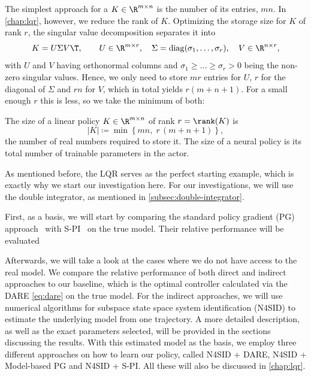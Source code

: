 The simplest approach for a $K \in \R^{m \times n}$ is the number of its entries,
$m n$. In \cref{chap:lqr}, however, we reduce the rank of $K$.
Optimizing the storage size for $K$ of rank $r$, the singular value decomposition
 separates it into
\begin{equation}
    \label{eq:svd}
    K = U \Sigma V\T ,
    \qquad
    U \in \R^{m \times r}, \quad
    \Sigma = \operatorname{diag}(\sigma_1, \dots, \sigma_r), \quad
    V \in \R^{n \times r} ,
\end{equation}
with $U$ and $V$ having orthonormal columns and $\sigma_1 \geq \dots \geq
\sigma_r > 0$ being the non-zero singular values. Hence, we only need to
store $mr$ entries for $U$, $r$ for the diagonal of $\Sigma$ and
$rn$ for $V$, which in total yields $r(m + n + 1)$. 
For a small enough $r$ this is less, so we take the minimum of both:

\begin{definition}
\label{def:policy-size}
The size of a linear policy $K \in \R^{m \times n}$ of rank
$r = \rank(K)$ is
\begin{equation*}
    \lvert K \rvert \coloneqq \min \left\{ m n, \; r \, (m + n + 1) \right\} ,
\end{equation*}
the number of real numbers required to store it.
The size of a neural policy is its total number of trainable parameters in the
actor.
\end{definition}

As mentioned before, the LQR serves as the perfect starting example,
which is exactly why we start our investigation here. For our investigations, we will
use the double integrator, as mentioned in \cref{subsec:double-integrator}.

First, as a basis, we will start by comparing
the standard policy gradient (PG) approach~\cite{Fazel2018Global} with S-PI~\cite{Park2020Structured}
on the true model. Their relative performance will be evaluated

Afterwards, we will take a look at the cases where we do not have access to the real model. We compare
the relative performance of both direct and indirect approaches to our baseline, which is
the optimal controller calculated via the DARE \eqref{eq:dare} on the true model. For the indirect
approaches, we will use numerical algorithms for subspace state space system identification
(N4SID) to estimate the underlying model from one
trajectory. A more detailed description, as well as the exact parameters selected,
will be provided in the sections discussing the results. With this estimated model as
the basis, we employ three different approaches on how to learn our policy, called
N4SID + DARE, N4SID + Model-based PG and N4SID + S-PI. All these will also be discussed in \cref{chap:lqr}.

